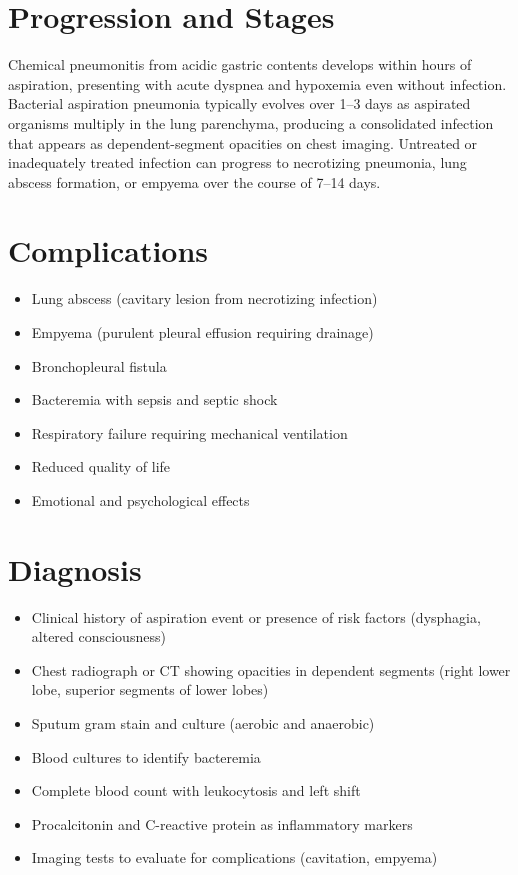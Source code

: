 \section{Progression and Stages}
Chemical pneumonitis from acidic gastric contents develops within hours of aspiration, presenting with acute dyspnea and hypoxemia even without infection. Bacterial aspiration pneumonia typically evolves over 1--3 days as aspirated organisms multiply in the lung parenchyma, producing a consolidated infection that appears as dependent-segment opacities on chest imaging. Untreated or inadequately treated infection can progress to necrotizing pneumonia, lung abscess formation, or empyema over the course of 7--14 days.

\section{Complications}

\begin{itemize}[noitemsep]
  \item Lung abscess (cavitary lesion from necrotizing infection)
  \item Empyema (purulent pleural effusion requiring drainage)
  \item Bronchopleural fistula
  \item Bacteremia with sepsis and septic shock
  \item Respiratory failure requiring mechanical ventilation
  \item Reduced quality of life
  \item Emotional and psychological effects
\end{itemize}

\section{Diagnosis}

\begin{itemize}[noitemsep]
  \item Clinical history of aspiration event or presence of risk factors (dysphagia, altered consciousness)
  \item Chest radiograph or CT showing opacities in dependent segments (right lower lobe, superior segments of lower lobes)
  \item Sputum gram stain and culture (aerobic and anaerobic)
  \item Blood cultures to identify bacteremia
  \item Complete blood count with leukocytosis and left shift
  \item Procalcitonin and C-reactive protein as inflammatory markers
  \item Imaging tests to evaluate for complications (cavitation, empyema)
\end{itemize}

